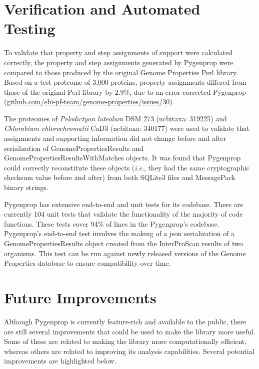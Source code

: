 \section{Verification and Automated Testing}

To validate that property and step assignments of support were calculated 
correctly, the property and step assignments generated by Pygenprop were 
compared to those produced by the original Genome Properties Perl library. Based 
on a test proteome of 3,000 proteins, property assignments differed from those 
of the original Perl library by 2.9\%, due to an error corrected Pygenprop 
(\href{http://github.com/ebi-pf-team/genome-properties/issues/30}{github.com/ebi-pf-team/genome-properties/issues/30}).

The proteomes of \textit{Pelodictyon luteolum} DSM 273 (\gls{ncbitaxa}:  319225) 
and \textit{Chlorobium chlorochromatii} CaD3 (\gls{ncbitaxa}: 340177) were used 
to validate that assignments and supporting information did not change before 
and after serialization of GenomePropertiesResults and 
GenomePropertiesResultsWithMatches objects. It was found that Pygenprop could 
correctly reconstitute these objects (\textit{i}.\textit{e}., they had the same 
cryptographic checksum value before and after) from both SQLite3 files and 
MessagePack binary strings.

Pygenprop has extensive end-to-end and unit tests for its codebase. There are 
currently 104 unit tests that validate the functionality of the majority of code 
functions. These tests cover 94\% of lines in the Pygenprop's codebase. 
Pygenprop's end-to-end test involves the making of a \gls{json} serialization of 
a GenomePropertiesResults object created from the InterProScan results of two 
organisms. This test can be run against newly released versions of the Genome 
Properties database to ensure compatibility over time. 

\section{Future Improvements}

Although Pygenprop is currently feature-rich and available to the public, there 
are still several improvements that could be used to make the library more 
useful. Some of these are related to making the library more computationally 
efficient, whereas others are related to improving its analysis capabilities. 
Several potential improvements are highlighted below.

